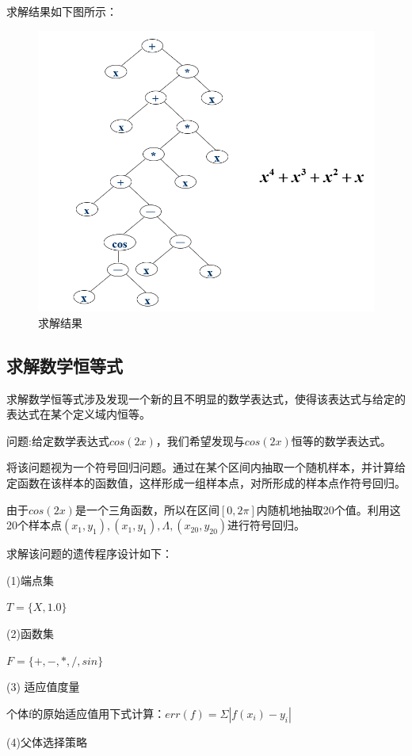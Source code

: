 \documentclass[UTF8]{ctexart}
\begin{document}
  \newpage
  求解结果如下图所示：
 	\begin{figure}[ht]
  		\centering	
  		\includegraphics[scale=0.5]{images/answer4.png}
  		\caption{求解结果}
  		\label{fig:label}
  	\end{figure}
\subsection{求解数学恒等式}
求解数学恒等式涉及发现一个新的且不明显的数学表达式，使得该表达式与给定的表达式在某个定义域内恒等。

问题:给定数学表达式$cos(2x)$，我们希望发现与$cos(2x)$恒等的数学表达式。

将该问题视为一个符号回归问题。通过在某个区间内抽取一个随机样本，并计算给定函数在该样本的函数值，这样形成一组样本点，对所形成的样本点作符号回归。

由于$cos(2x)$是一个三角函数，所以在区间$[0,2\pi]$内随机地抽取20个值。利用这20个样本点$(x_{1},y_{1}),(x_{1},y_{1}),\Lambda,(x_{20},y_{20})$进行符号回归。

求解该问题的遗传程序设计如下：

(1)端点集

$T=\{X,1.0\}$

(2)函数集

$F=\{+,-,*,/,sin\}$

(3) 适应值度量

个体f的原始适应值用下式计算：$err(f)=\Sigma|f(x_{i})-y_{i}|$

(4)父体选择策略
\end{document}
